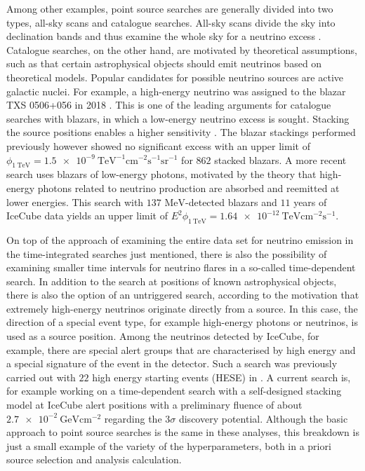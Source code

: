 Among other examples, point source searches are generally divided into two types, all-sky scans and catalogue searches.
All-sky scans divide the sky into declination bands and thus examine the whole sky for a neutrino excess \cite{all_sky_paper}.
Catalogue searches, on the other hand, are motivated by theoretical assumptions, such as that certain astrophysical objects should emit neutrinos based on theoretical models.
Popular candidates for possible neutrino sources are active galactic nuclei.
For example, a high-energy neutrino was assigned to the blazar TXS 0506+056 in 2018 \cite{txs}.
This is one of the leading arguments for catalogue searches with blazars, in which a low-energy neutrino excess is sought.
Stacking the source positions enables a higher sensitivity \cite{stacking_argument}.
The blazar stackings performed previously however \cite{blazar_stacking_2017} showed no significant excess with an upper limit of $\phi_{\SI{1}{\tera\electronvolt}}=\SI{1.5e-9}{\tera\electronvolt\tothe{-1}\centi\meter\tothe{-2}\second\tothe{-1}\steradian\tothe{-1}}$ for $\num{862}$ stacked blazars.
A more recent search \cite{blazar_stacking_2020} uses blazars of low-energy photons, motivated by the theory that high-energy photons related to neutrino production are absorbed and reemitted at lower energies.
This search with $\num{137}$ $\si{\mega\electronvolt}$-detected blazars and $\num{11}$ years of IceCube data yields an upper limit of $E^2\phi_{\SI{1}{\tera\electronvolt}}=\SI{1.64e-12}{\tera\electronvolt\centi\meter\tothe{-2}\second\tothe{-1}}$.

On top of the approach of examining the entire data set for neutrino emission in the time-integrated searches just mentioned, there is also the possibility of examining smaller time intervals for neutrino flares in a so-called time-dependent search.
In addition to the search at positions of known astrophysical objects, there is also the option of an untriggered search, according to the motivation that extremely high-energy neutrinos originate directly from a source.
In this case, the direction of a special event type, for example high-energy photons or neutrinos, is used as a source position.
Among the neutrinos detected by IceCube, for example, there are special alert groups that are characterised by high energy and a special signature of the event in the detector.
Such a search was previously carried out with $\num{22}$ high energy starting events (HESE) in \cite{thorben}.
A current search is, for example \cite{martina} working on a time-dependent search with a self-designed stacking model at IceCube alert positions with a preliminary fluence of about $\SI{2.7e-2}{\giga\electronvolt\centi\meter\tothe{-2}}$ regarding the $\num{3}\sigma$ discovery potential.
Although the basic approach to point source searches is the same in these analyses, this breakdown is just a small example of the variety of the hyperparameters, both in a priori source selection and analysis calculation.

